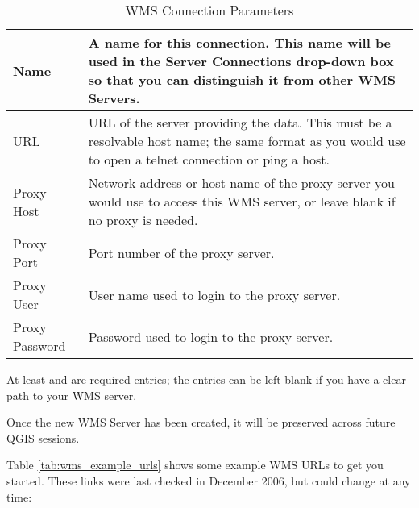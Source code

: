 \begin{table}[ht]
\centering
\caption{WMS Connection Parameters}\label{tab:wms_connection_parms}\medskip
 \begin{tabular}{|l|p{5in}|}
\hline Name & A name for this connection.  This name will be used in the
 Server Connections drop-down box so that you can distinguish it from
 other WMS Servers. \\
\hline URL \index{WMS!URL} & URL of the server providing the data.
 This must be a resolvable host name; the same format as you would use 
 to open a telnet connection or ping a host. \\
\hline Proxy Host & Network address or host name of the proxy server
 you would use to access this WMS server, or leave blank if no proxy is needed. \\
\hline Proxy Port & Port number of the proxy server. \\
\hline Proxy User & User name used to login to the proxy server. \\
\hline Proxy Password & Password used to login to the proxy server. \\
\hline
\end{tabular}
\end{table}

At least  and  are required entries; the
 entries 
can be left blank if you have a clear path to your WMS server.

Once the new WMS Server has been created, it will be preserved across future 
QGIS sessions.

\begin{Tip}[ht]\caption{\textsc{On WMS Server URLs}}
\end{Tip}

Table \ref{tab:wms_example_urls} shows some example WMS URLs to get you started.
These links were last checked in December 2006, but could change at any time:


